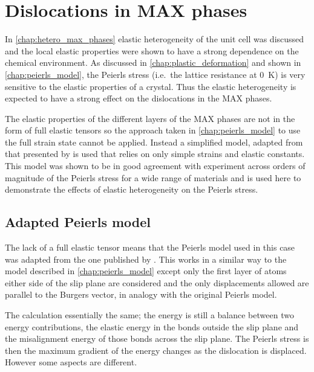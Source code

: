 
\chapter{Dislocations in MAX phases}

\label{chap:dislocations_in_max_phases}
\graphicspath{{dislocations_in_max_phases/Figs/}}






In \autoref{chap:hetero_max_phases} elastic heterogeneity of the unit cell was discussed and the local elastic properties were shown to have a strong dependence on the chemical environment. As discussed in  \autoref{chap:plastic_deformation} and shown in \autoref{chap:peierls_model}, the Peierls stress (i.e.\ the lattice resistance at \SI{0}{\kelvin}) is very sensitive to the elastic properties of a crystal. Thus the elastic heterogeneity is expected to have a strong effect on the dislocations in the MAX phases.

The elastic properties of the different layers of the MAX phases are not in the form of full elastic tensors so the approach taken in \autoref{chap:peierls_model} to use the full strain state cannot be applied. Instead a simplified model, adapted from that presented by \citet{Clegg2006} is used that relies on only simple strains and elastic constants. This model was shown to be in good agreement with experiment across orders of magnitude of the Peierls stress for a wide range of materials and is used here to demonstrate the effects of elastic heterogeneity on the Peierls stress.


\section{Adapted Peierls model}

The lack of a full elastic tensor means that the Peierls model used in this case was adapted from the one published by \cite{Clegg2006}. This works in a similar way to the model described in \autoref{chap:peierls_model} except only the first layer of atoms either side of the slip plane are considered and the only displacements allowed are parallel to the Burgers vector, in analogy with the original Peierls model.

The calculation essentially the same; the energy is still a balance between two energy contributions, the elastic energy in the bonds outside the slip plane and the misalignment energy of those bonds across the slip plane. The Peierls stress is then the maximum gradient of the energy changes as the dislocation is displaced. However some aspects are different.



